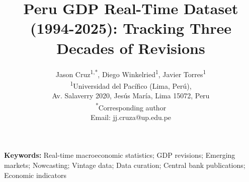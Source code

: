 \documentclass[12pt]{article}
\begin{document}

\title{%
Peru GDP Real-Time Dataset (1994-2025): Tracking Three Decades of Revisions
}

\author{%
Jason Cruz\textsuperscript{1,*}, Diego Winkelried\textsuperscript{1}, Javier Torres\textsuperscript{1} \\[1mm]
\small\textsuperscript{1}{Universidad del Pacífico (Lima, Perú)}, \\
\small Av. Salaverry 2020, Jesús María, Lima 15072, Peru \\[2mm]
\small\textsuperscript{*}Corresponding author \\
\small Email: jj.cruza@up.edu.pe
}

\date{} %

\maketitle

\noindent\textbf{Keywords:}
Real-time macroeconomic statistics; GDP revisions; Emerging markets; Nowcasting; Vintage data; Data curation; Central bank publications; Economic indicators
\end{document}
